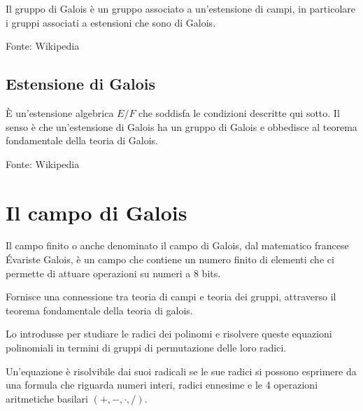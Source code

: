   

\textsf{\small Il gruppo di Galois è un gruppo associato a un'estensione di campi, in particolare i gruppi associati a estensioni che sono di Galois.} %

\textsf{\small Fonte: Wikipedia \cite{wikipediagruppodigalois}\relax }

\subsection{Estensione di Galois}

 

\textsf{\small È un'estensione algebrica $E/F$ che soddisfa le condizioni descritte qui sotto. Il senso è che un'estensione di Galois ha un gruppo di Galois e obbedisce al teorema fondamentale della teoria di Galois.} %

\textsf{\small Fonte: Wikipedia \cite{wikipediaestensionedigalois}\relax }


\section{Il campo di Galois}


\textsf{\small Il campo finito o anche denominato il campo di Galois, dal matematico francese Évariste Galois, è un campo che contiene un numero finito di elementi che ci permette di attuare operazioni su numeri a 8 bits.} %

  

\textsf{\small Fornisce una connessione tra teoria di campi e teoria dei gruppi, attraverso il teorema fondamentale della teoria di galois.} %

\textsf{\small Lo introdusse per studiare le radici dei polinomi e risolvere queste equazioni polinomiali in termini di gruppi di permutazione delle loro radici.}

\textsf{\small Un'equazione è risolvibile dai suoi radicali se le sue radici si possono esprimere da una formula che riguarda numeri interi, radici ennesime e le 4 operazioni aritmetiche basilari $(+, -, \cdot, /)$.}

